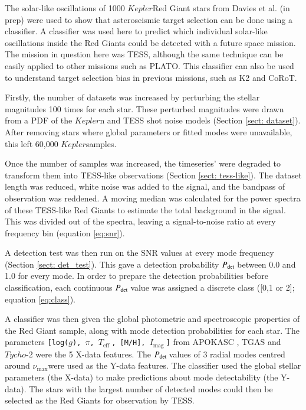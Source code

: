 \documentclass[a4paper,fleqn,usenatbib,useAMS]{mnras}
\newcommand{\numax}{\ensuremath{\nu_{\textrm{max}}}}
\newcommand{\teff}{\ensuremath{T_{\textrm{eff}}\:}}
\newcommand{\kep}{\ensuremath{Kepler}\:}
\newcommand{\pdet}{\ensuremath{P_{\rm det}\:}}
\newcommand{\imag}{\ensuremath{I_{\textrm{mag}}\:}}
\begin{document}
The solar-like oscillations of 1000 \kep Red Giant stars from Davies et al. (in prep) were used to show that asteroseismic target selection can be done using a classifier. A classifier was used here to predict which individual solar-like oscillations inside the Red Giants could be detected with a future space mission. The mission in question here was TESS, although the same technique can be easily applied to other missions such as PLATO. This classifier can also be used to understand target selection bias in previous missions, such as K2 and CoRoT.

Firstly, the number of datasets was increased by perturbing the stellar magnitudes 100 times for each star. These perturbed magnitudes were drawn from a PDF of the $Kepler$n and TESS shot noise models (Section \ref{sect: dataset}). After removing stars where global parameters or fitted modes were unavailable, this left 60,000 \kep samples. 

Once the number of samples was increased, the timeseries' were degraded to transform them into TESS-like observations (Section \ref{sect: tess-like}). The dataset length was reduced, white noise was added to the signal, and the bandpass of observation was reddened. A moving median was calculated for the power spectra of these TESS-like Red Giants to estimate the total background in the signal. This was divided out of the spectra, leaving a signal-to-noise ratio at every frequency bin (equation \ref{eq:snr}).

A detection test was then run on the SNR values at every mode frequency (Section \ref{sect: det_test}). This gave a detection probability \pdet between 0.0 and 1.0 for every mode. In order to prepare the detection probabilities before classification, each continuous \pdet value was assigned a discrete class ([0,1 or 2]; equation \ref{eq:class}).

A classifier was then given the global photometric and spectroscopic properties of the Red Giant sample, along with mode detection probabilities for each star. The parameters \texttt{[log($g$), $\pi$, \teff, [M/H], \imag]} from APOKASC \citep{pinsonneault_apokasc_2014}, TGAS \citep{gaia_collaboration_gaia_2016} and $Tycho$-2 \citep{hog_tycho-2_2000} were the 5 X-data features. The \pdet values of 3 radial modes centred around \numax were used as the Y-data features. %
The classifier used the global stellar parameters (the X-data) to make predictions about mode detectability (the Y-data). The stars with the largest number of detected modes could then be selected as the Red Giants for observation by TESS. 
\end{document}

